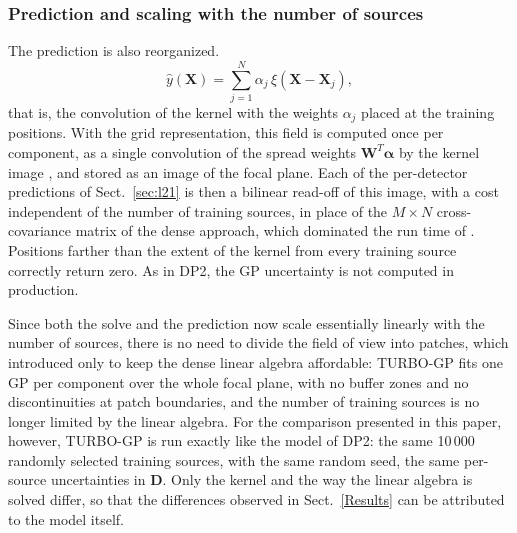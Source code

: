 \subsubsection{Prediction and scaling with the number of sources}
\label{sec:turbogp_predict}

The prediction is also reorganized.
\begin{equation}
\label{eq:meanfield}
\hat{y}(\mathbf{X}) = \sum_{j=1}^{N} \alpha_j\, \xi(\mathbf{X} - \mathbf{X}_j),
\end{equation}
that is, the convolution of the kernel with the weights $\alpha_j$ placed at the training positions.
With the grid representation, this field is computed once per component, as a single convolution of the spread
weights $\mathbf{W}^T \boldsymbol{\alpha}$ by the kernel image , and stored as an image of the focal plane.
Each of the per-detector predictions of Sect.~\ref{sec:l21} is then a bilinear read-off of this image, with a cost independent 
of the number of training sources, in place of the $M \times N$ cross-covariance matrix of the dense approach, which dominated 
the run time of .
Positions farther than the extent of the kernel from every training source correctly return zero.
As in DP2, the GP uncertainty is not computed in production.

Since both the solve and the prediction now scale essentially linearly with the number of sources, there is no need to divide 
the field of view into patches, which  introduced only to keep the dense linear algebra affordable: 
TURBO-GP fits one GP per component over the whole focal plane, with no buffer zones and no discontinuities at patch boundaries, and 
the number of training sources is no longer limited by the linear algebra.
For the comparison presented in this paper, however, TURBO-GP is run exactly like the  model of DP2: 
the same 10\,000 randomly selected training sources, with the same random seed, the same per-source uncertainties in $\mathbf{D}$.
Only the kernel and the way the linear algebra is solved differ, so that the differences observed in Sect.~\ref{Results} can be attributed to the model itself.

